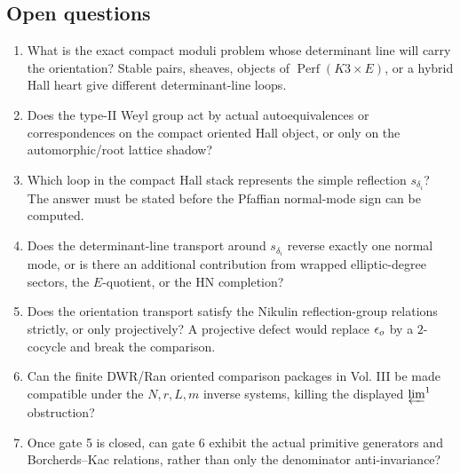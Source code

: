 \subsection{Open questions}

\begin{enumerate}
\item What is the exact compact moduli problem whose determinant line
will carry the orientation?  Stable pairs, sheaves, objects of
\(\operatorname{Perf}(K3\times E)\), or a hybrid Hall heart give
different determinant-line loops.

\item Does the type-II Weyl group act by actual autoequivalences or
correspondences on the compact oriented Hall object, or only on the
automorphic/root lattice shadow?

\item Which loop in the compact Hall stack represents the simple
reflection \(s_{\delta_i}\)?  The answer must be stated before the
Pfaffian normal-mode sign can be computed.

\item Does the determinant-line transport around \(s_{\delta_i}\) reverse
exactly one normal mode, or is there an additional contribution from
wrapped elliptic-degree sectors, the \(E\)-quotient, or the HN
completion?

\item Does the orientation transport satisfy the Nikulin reflection-group
relations strictly, or only projectively?  A projective defect would
replace \(\epsilon_o\) by a \(2\)-cocycle and break the comparison.

\item Can the finite DWR/Ran oriented comparison packages in Vol. III be
made compatible under the \(N,r,L,m\) inverse systems, killing the
displayed \(\varprojlim^1\) obstruction?

\item Once gate 5 is closed, can gate 6 exhibit the actual primitive
generators and Borcherds--Kac relations, rather than only the
denominator anti-invariance?
\end{enumerate}
